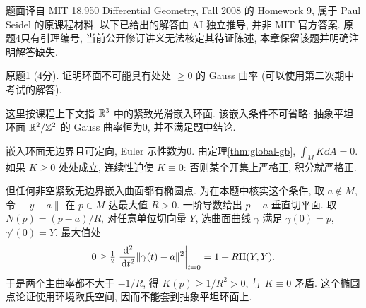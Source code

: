 \par{}
题面译自 MIT 18.950 Differential Geometry, Fall 2008 的 Homework 9, 属于 Paul Seidel 的原课程材料. 以下已给出的解答由 AI 独立推导, 并非 MIT 官方答案. 原题4只有引理编号, 当前公开修订讲义无法核定其待证陈述, 本章保留该题并明确注明解答缺失.

\par{}
\begin{exercise}\label{ps:9-1}
原题1 (4分). 证明环面不可能具有处处 $\ge0$ 的 Gauss 曲率 (可以使用第二次期中考试的解答).
\end{exercise}
\begin{remark}
这里按课程上下文指 $\mathbb R^3$ 中的紧致光滑嵌入环面. 该嵌入条件不可省略: 抽象平坦环面 $\mathbb R^2/\mathbb Z^2$ 的 Gauss 曲率恒为0, 并不满足题中结论.
\end{remark}
\begin{solution}
嵌入环面无边界且可定向, Euler 示性数为0. 由定理\ref{thm:global-gb}, $\int_MK\dd A=0$. 如果 $K\ge0$ 处处成立, 连续性迫使 $K\equiv0$: 否则某个开集上严格正, 积分就严格正.

但任何非空紧致无边界嵌入曲面都有椭圆点. 为在本题中核实这个条件, 取 $a\notin M$, 令 $\|y-a\|$ 在 $p\in M$ 达最大值 $R>0$. 一阶导数给出 $p-a$ 垂直切平面. 取 $N(p)=(p-a)/R$, 对任意单位切向量 $Y$, 选曲面曲线 $\gamma$ 满足 $\gamma(0)=p$, $\gamma'(0)=Y$. 最大值处
\[
 0\ge\tfrac12\left.\frac{\,\mathrm d^2}{\,\mathrm d t^2}\|\gamma(t)-a\|^2\right|_{t=0}
 =1+R\mathrm{II}(Y,Y).
\]
于是两个主曲率都不大于 $-1/R$, 得 $K(p)\ge1/R^2>0$, 与 $K\equiv0$ 矛盾. 这个椭圆点论证使用环境欧氏空间, 因而不能套到抽象平坦环面上.
\end{solution}


